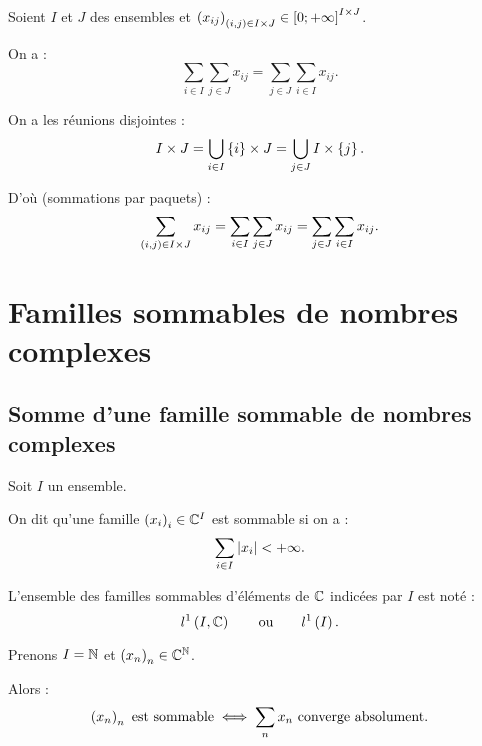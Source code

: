 \begin{cor}
Soient \(I\) et \(J\) des ensembles et \(\left(x_{ij}\right)_{\left(i,j\right)\in I\times J}\in\left[0;+\infty\right]^{I\times J}\).

On a : \[\sum_{i\in I}\sum_{j\in J}x_{ij}=\sum_{j\in J}\sum_{i\in I}x_{ij}.\]
\end{cor}

\begin{dem}
On a les réunions disjointes : \[I\times J=\bigcup_{i\in I}\left\lbrace i\right\rbrace\times J=\bigcup_{j\in J}I\times\left\lbrace j\right\rbrace.\]

D'où (sommations par paquets) : \[\sum_{\left(i,j\right)\in I\times J}x_{ij}=\sum_{i\in I}\sum_{j\in J}x_{ij}=\sum_{j\in J}\sum_{i\in I}x_{ij}.\]
\end{dem}

\section{Familles sommables de nombres complexes}

\subsection{Somme d'une famille sommable de nombres complexes}

\begin{defi}
Soit \(I\) un ensemble.

On dit qu'une famille \(\left(x_i\right)_i\in\mathbb{C}^I\) est sommable si on a : \[\sum_{i\in I}\left\lvert x_i\right\rvert<+\infty.\]

L'ensemble des familles sommables d'éléments de \(\mathbb{C}\) indicées par \(I\) est noté : \[l^1\left(I,\mathbb{C}\right)\qquad\text{ou}\qquad l^1\left(I\right).\]
\end{defi}

\begin{ex}
Prenons \(I=\mathbb{N}\) et \(\left(x_n\right)_n\in\mathbb{C}^{\mathbb{N}}\).

Alors : \[\left(x_n\right)_n\text{ est sommable}\iff\sum_nx_n\text{ converge absolument}.\]
\end{ex}


